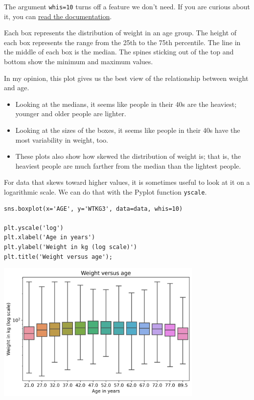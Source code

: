 The argument \passthrough{\lstinline!whis=10!} turns off a feature we
don't need. If you are curious about it, you can
\href{https://seaborn.pydata.org/generated/seaborn.boxplot.html}{read
the documentation}.

Each box represents the distribution of weight in an age group. The
height of each box represents the range from the 25th to the 75th
percentile. The line in the middle of each box is the median. The spines
sticking out of the top and bottom show the minimum and maximum values.

In my opinion, this plot gives us the best view of the relationship
between weight and age.

\begin{itemize}
\item
  Looking at the medians, it seems like people in their 40s are the
  heaviest; younger and older people are lighter.
\item
  Looking at the sizes of the boxes, it seems like people in their 40s
  have the most variability in weight, too.
\item
  These plots also show how skewed the distribution of weight is; that
  is, the heaviest people are much farther from the median than the
  lightest people.
\end{itemize}

For data that skews toward higher values, it is sometimes useful to look
at it on a logarithmic scale. We can do that with the Pyplot function
\passthrough{\lstinline!yscale!}.

\begin{lstlisting}[]
sns.boxplot(x='AGE', y='WTKG3', data=data, whis=10)

plt.yscale('log')
plt.xlabel('Age in years')
plt.ylabel('Weight in kg (log scale)')
plt.title('Weight versus age');
\end{lstlisting}

\begin{center}
\includegraphics[width=4in]{chapters/09_relationships_files/09_relationships_46_0.png}
\end{center}

